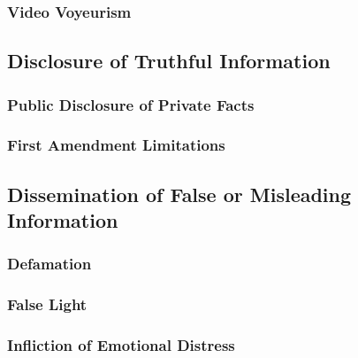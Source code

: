 
\subsubsection{Video Voyeurism}


\subsection{Disclosure of Truthful Information}

\subsubsection{Public Disclosure of Private Facts}


\subsubsection{First Amendment Limitations}


\subsection{Dissemination of False or Misleading Information}

\subsubsection{Defamation}


\subsubsection{False Light}


\subsubsection{Infliction of Emotional Distress}

